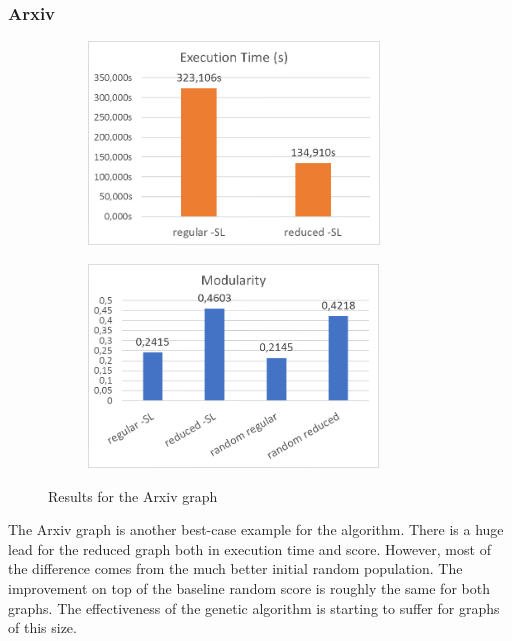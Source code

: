 \subsubsection{Arxiv}
\begin{figure}[H]
\begin{center}
    \begin{subfigure}{0.47\textwidth}
    \begin{center}
    \includegraphics[height=5.4cm]{images/arxivtime.png}
    \end{center}
    \end{subfigure}
    \begin{subfigure}{0.47\textwidth}
    \begin{center}
    \includegraphics[height=5.4cm]{images/arxivfitness.png}
    \end{center}
    \end{subfigure}
\caption{Results for the Arxiv graph}\label{fig:arxiv}
\end{center}
\end{figure}
The Arxiv graph is another best-case example for the algorithm. There is a huge lead for the reduced graph both in execution time and score. However, most of the difference comes from the much better initial random population. The improvement on top of the baseline random score is roughly the same for both graphs. The effectiveness of the genetic algorithm is starting to suffer for graphs of this size.
